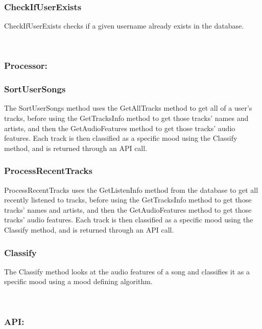 \documentclass[11pt]{report}
\begin{document}
\subsubsection{CheckIfUserExists}
CheckIfUserExists checks if a given username already exists in the database.



\leavevmode \\

\subsubsection{Processor:}

\hrulefill

\subsubsection{SortUserSongs}
The SortUserSongs method uses the GetAllTracks method to get all of a user’s tracks, before using the GetTracksInfo method to get those tracks’ names and artists, and then the GetAudioFeatures method to get those tracks’ audio features. Each track is then classified as a specific mood using the Classify method, and is returned through an API call.

\subsubsection{ProcessRecentTracks}
ProcessRecentTracks uses the GetListenInfo method from the database to get all recently listened to tracks, before using the GetTracksInfo method to get those tracks’ names and artists, and then the GetAudioFeatures method to get those tracks’ audio features. Each track is then classified as a specific mood using the Classify method, and is returned through an API call.

\subsubsection{Classify}
The Classify method looks at the audio features of a song and classifies it as a specific mood using a mood defining algorithm.


\leavevmode \\

\subsubsection{API:}

\hrulefill
\end{document}
